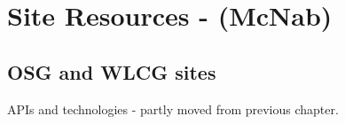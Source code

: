 \chapter{Site Resources - (McNab)}
\label{ch:sites}

\section{OSG and WLCG sites}
\label{sec:sites:osg_and_wlcg}  %

APIs and technologies - partly moved from previous chapter.


